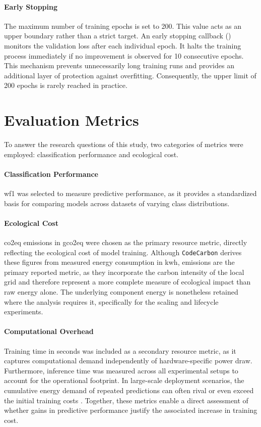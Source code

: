 \paragraph{Early Stopping}
The maximum number of training epochs is set to 200. This value acts as an upper boundary rather than a strict target. An early stopping callback () monitors the validation loss after each individual epoch. It halts the training process immediately if no improvement is observed for 10 consecutive epochs. This mechanism prevents unnecessarily long training runs and provides an additional layer of protection against overfitting. Consequently, the upper limit of 200 epochs is rarely reached in practice.

\section{Evaluation Metrics}
\label{design_metrics}

To answer the research questions of this study, two categories of metrics were employed: classification performance and ecological cost.

\paragraph{Classification Performance}
\Gls{wf1} was selected to measure predictive performance, as it provides a standardized basis for comparing models across datasets of varying class distributions.

\paragraph{Ecological Cost}
\Gls{co2eq} emissions in \gls{gco2eq} were chosen as the primary resource metric, directly reflecting the ecological cost of model training. Although \texttt{CodeCarbon} derives these figures from measured energy consumption in \gls{kwh}, emissions are the primary reported metric, as they incorporate the carbon intensity of the local grid and therefore represent a more complete measure of ecological impact than raw energy alone. The underlying component energy is nonetheless retained where the analysis requires it, specifically for the scaling and lifecycle experiments.

\paragraph{Computational Overhead}
Training time in seconds was included as a secondary resource metric, as it captures computational demand independently of hardware-specific power draw.
Furthermore, inference time was measured across all experimental setups to account for the operational footprint. In large-scale deployment scenarios, the cumulative energy demand of repeated predictions can often rival or even exceed the initial training costs \cite{desislavovTrendsAIInference2023}.
Together, these metrics enable a direct assessment of whether gains in predictive performance justify the associated increase in training cost.

